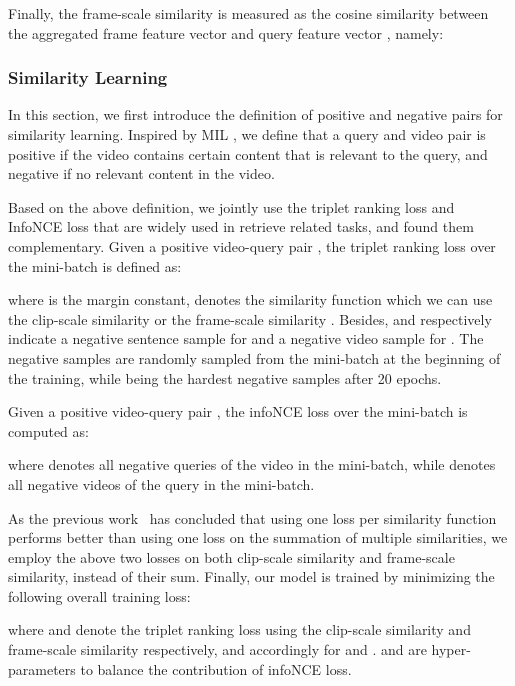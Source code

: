 \documentclass[sigconf]{acmart}
\begin{document}
Finally, the frame-scale similarity is measured as the cosine similarity between the aggregated frame feature vector  and query feature vector , namely:




\subsubsection{Similarity Learning}
In this section, we first introduce the definition of positive and negative pairs for similarity learning.
Inspired by MIL \cite{dietterich1997solving,maron1997framework}, we define that a query and video pair is positive if the video contains certain content that is relevant to the query, and negative if no relevant content in the video. 

Based on the above definition, we jointly use the triplet ranking loss \cite{faghri2017vse++,dong2021dual} and InfoNCE loss \cite{miech2020end,zhang2021video} that are widely used in retrieve related tasks, and found them complementary. 
Given a positive video-query pair , the triplet ranking loss over the mini-batch  is defined as:

where  is the margin constant,  denotes the similarity function which we can use the clip-scale similarity  or the frame-scale similarity . Besides,  and  respectively indicate a negative sentence sample for  and a negative video sample for . The negative samples are randomly sampled from the mini-batch at the beginning of the training, while being the hardest negative samples after 20 epochs.

Given a positive video-query pair , the infoNCE loss over the mini-batch  is computed as:

where  denotes all negative queries of the video  in the mini-batch, while  denotes all negative videos of the query  in the mini-batch.

As the previous work~\cite{li2020sea} has concluded that using one loss per similarity function performs better than using one loss on the summation of multiple similarities, we employ the above two losses on both clip-scale similarity and frame-scale similarity, instead of their sum.
Finally, our model is trained by minimizing the following overall training loss:

where  and  denote the triplet ranking loss using the clip-scale similarity  and frame-scale similarity  respectively, and accordingly for  and .  and  are hyper-parameters to balance the contribution of infoNCE loss.
\end{document}
